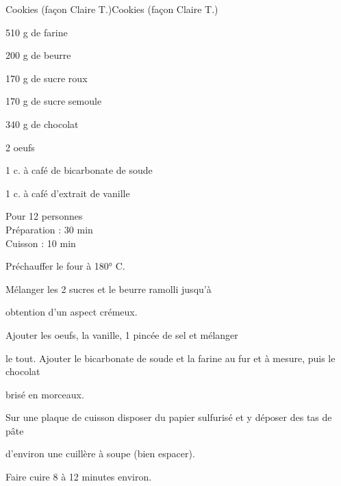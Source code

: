 \begin{recette}{Cookies (façon Claire T.)}{Cookies (façon Claire T.)}

\begin{ingredients}
510 g de farine\par
200 g de beurre\par
170 g de sucre roux\par
170 g de sucre semoule\par
340 g de chocolat\par
2 oeufs\par
1 c. à café de bicarbonate de soude\par
1 c. à café d'extrait de vanille\par
\end{ingredients}

\begin{infos}
Pour 12 personnes\\
Préparation : 30 min\\
Cuisson : 10 min\\
\end{infos}

\begin{etapes}
\item Préchauffer le four à 180° C.
\item Mélanger les 2 sucres et le beurre ramolli jusqu'à
\item obtention d'un aspect crémeux.
\item Ajouter les oeufs, la vanille, 1 pincée de sel et mélanger
\item le tout. Ajouter le bicarbonate de soude et la farine au fur et à mesure, puis le chocolat
\item brisé en morceaux.
\item Sur une plaque de cuisson disposer du papier sulfurisé et y déposer des tas de pâte
\item d'environ une cuillère à soupe (bien espacer).
\item Faire cuire 8 à 12 minutes environ.
\end{etapes}

\end{recette}